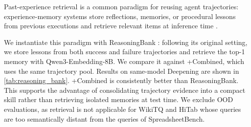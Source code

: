 \Needspace{0.40\textheight}
Past-experience retrieval is a common paradigm for reusing agent trajectories: experience-memory systems store reflections, memories, or procedural lessons from previous executions and retrieve relevant items at inference time \citep{shinn2023reflexionlanguageagentsverbal,wang2023voyageropenendedembodiedagent,ouyang2026reasoningbankscalingagentselfevolving,fang2026mempexploringagentprocedural,wang2024agentworkflowmemory,liu2025contextualexperiencereplayselfimprovement}.

\begin{table}
\centering

\end{table}
We instantiate this paradigm with ReasoningBank \citep{ouyang2026reasoningbankscalingagentselfevolving}: following its original setting, we store lessons from both success and failure trajectories and retrieve the top-1 memory with Qwen3-Embedding-8B.
We compare it against +Combined, which uses the same trajectory pool. Results on same-model Deepening are shown in \cref{tab:reasoning_bank}. +Combined is consistently better than ReasoningBank.
This supports the advantage of consolidating trajectory evidence into a compact skill rather than retrieving isolated memories at test time. We exclude OOD evaluations, as retrieval is not applicable for WikiTQ and HiTab whose queries are too semantically distant from the queries of SpreadsheetBench.

\WFclear

